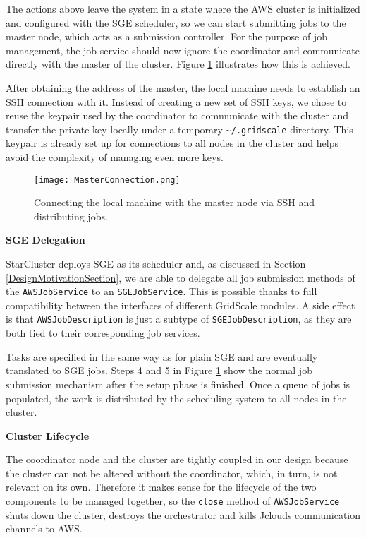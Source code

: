 The actions above leave the system in a state where the AWS cluster is initialized and configured with the SGE scheduler, so we can start submitting jobs to the master node, which acts as a submission controller. For the purpose of job management, the job service should now ignore the coordinator and communicate directly with the master of the cluster. Figure \ref{MasterConnection} illustrates how this is achieved.

After obtaining the address of the master, the local machine needs to establish an SSH connection with it. Instead of creating a new set of SSH keys, we chose to reuse the keypair used by the coordinator to communicate with the cluster and transfer the private key locally under a temporary \verb|~/.gridscale| directory. This keypair is already set up for connections to all nodes in the cluster and helps avoid the complexity of managing even more keys.

\begin{figure}[h]
	\centering
		\texttt{[image: MasterConnection.png]}
	\caption{Connecting the local machine with the master node via SSH and distributing jobs.}
	\label{MasterConnection}
\end{figure}

\vspace{2mm}
\textbf{SGE Delegation}
\vspace{1mm}

StarCluster deploys SGE as its scheduler and, as discussed in Section \ref{DesignMotivationSection}, we are able to delegate all job submission methods of the \verb|AWSJobService| to an \verb|SGEJobService|. This is possible thanks to full compatibility between the interfaces of different GridScale modules. A side effect is that \verb|AWSJobDescription| is just a subtype of \verb|SGEJobDescription|, as they are both tied to their corresponding job services.


 Tasks are specified in the same way as for plain SGE and are eventually translated to SGE jobs. Steps 4 and 5 in Figure \ref{MasterConnection} show the normal job submission mechanism after the setup phase is finished. Once a queue of jobs is populated, the work is distributed by the scheduling system to all nodes in the cluster.

\vspace{1mm}
\textbf{Cluster Lifecycle}

The coordinator node and the cluster are tightly coupled in our design because the cluster can not be altered without the coordinator, which, in turn, is not relevant on its own. Therefore it makes sense for the lifecycle of the two components to be managed together, so the \verb|close| method of \verb|AWSJobService| shuts down the cluster, destroys the orchestrator and kills Jclouds communication channels to AWS.

